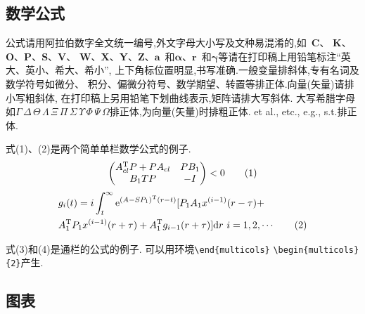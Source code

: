 \documentclass{Style/aas}
\begin{document}
\begin{multicols}{2}
  \subsection{数学公式}

  公式请用阿拉伯数字全文统一编号,外文字母大小写及文种易混淆的,如~{\bf C}、
  {\bf K}、{\bf O}、{\bf P}、{\bf S}、{\bf V}、{\bf
  W}、{\bf X}、{\bf Y}、{\bf Z}、${\pmb a}$~和${\pmb\alpha}$、${\pmb
        r}$~和${\pmb\gamma}$等请在打印稿上用铅笔标注``英大、英小、希大、希小'',
  上下角标位置明显,书写准确.一般变量排斜体,专有名词及数学符号如微分、
  积分、偏微分符号、数学期望、转置等排正体.向量(矢量)请排小写粗斜体,
  在打印稿上另用铅笔下划曲线表示,矩阵请排大写斜体.
  大写希腊字母如$\Gamma\,\Delta\,\Theta\,\Lambda\,\Xi\,\Pi\,\Sigma\,
    \Upsilon\,\Phi\,\Psi\,\Omega$排正体,为向量(矢量)时排粗正体. et al.,
  etc., e.g., s.t.排正体.

  式(1)、(2)是两个简单单栏数学公式的例子.
  \begin{equation}
    \begin{pmatrix}
      A_{cl}^{\rm T}P+PA_{cl} & PB_1 \\
      B_1TP                   & -I
    \end{pmatrix}
    <0 \tag{1}
  \end{equation}
  \allowdisplaybreaks
  \begin{align}
     & {\sl g}_i(t)=i\int_t^\infty {\rm e}^{(A-SP_1)^{\rm T}(r-t)}[P_1A_1
    x^{(i-1)}(r-\tau)+
    \nonumber                                                             \\
     & A_1^{\rm T}P_1 x^{(i-1)}(r+\tau)+A_1^ {\rm T}{\sl
    g}_{i-1}(r+\tau)]{\rm d}r\ i=1,2,\cdots \tag{2}
  \end{align}


  式(3)和(4)是通栏的公式的例子.
  可以用环境\verb|\end{multicols}| \verb|\begin{multicols}{2}|产生.

  \subsection{图表}




\end{multicols}
\end{document}
